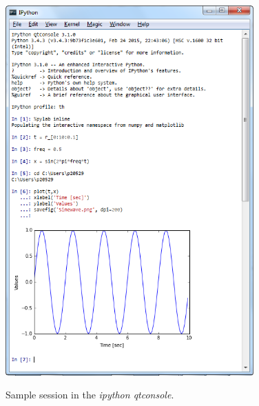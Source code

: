 \begin{figure}
  \centering
  \includegraphics[width=0.85\textwidth]{../Images/qtConsole.png}\\
  \caption{Sample session in the \emph{ipython qtconsole}.}
  \label{fig:qtConsole}
\end{figure}


